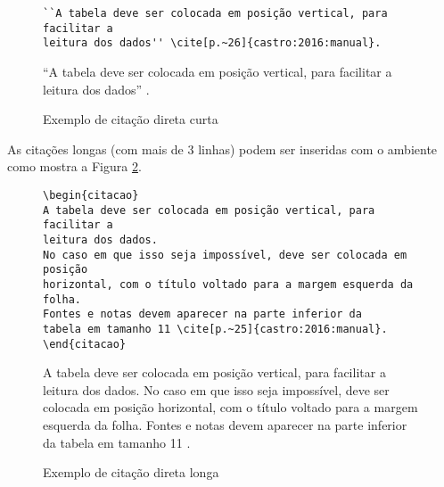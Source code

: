 \begin{figure}[htb]
\hrulefill

\begin{verbatim}
``A tabela deve ser colocada em posição vertical, para facilitar a
leitura dos dados'' \cite[p.~26]{castro:2016:manual}.
\end{verbatim}

\hrulefill

``A tabela deve ser colocada em posição vertical, para facilitar a leitura dos dados'' \cite[p.~25]{castro:2016:manual}.

\hrulefill

\caption{Exemplo de citação direta curta}
\label{figura:citacao_direta_curta}
\end{figure}

As citações longas (com mais de 3 linhas) podem ser inseridas com o ambiente  como mostra a Figura \ref{figura:citacao_direta_longa}.

\begin{figure}[htb]
\hrulefill

\begin{verbatim}
\begin{citacao}
A tabela deve ser colocada em posição vertical, para facilitar a
leitura dos dados.
No caso em que isso seja impossível, deve ser colocada em posição
horizontal, com o título voltado para a margem esquerda da folha.
Fontes e notas devem aparecer na parte inferior da
tabela em tamanho 11 \cite[p.~25]{castro:2016:manual}.
\end{citacao}
\end{verbatim}

\hrulefill

\begin{citacao}
A tabela deve ser colocada em posição vertical, para facilitar a leitura dos dados. No
caso em que isso seja impossível, deve ser colocada em posição horizontal, com o título
voltado para a margem esquerda da folha. Fontes e notas devem aparecer na parte inferior da
tabela em tamanho 11 \cite[p.~25]{castro:2016:manual}.
\end{citacao}

\hrulefill

\caption{Exemplo de citação direta longa}
\label{figura:citacao_direta_longa}
\end{figure}
